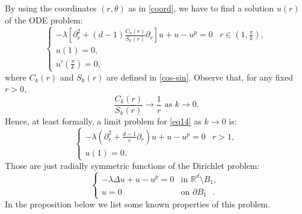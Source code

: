\documentclass[reqno]{amsart}
\numberwithin{equation}{section}
\newenvironment{key words}{\textbf{Keywords}\mbox{  }}{ }
\begin{document}
By using the coordinates $(r, \theta)$ as in \eqref{coord}, we have to find a solution $u(r)$ of the ODE problem:
\begin{equation}\label{eq14}
  \begin{cases}
  -\lambda\left[\partial_{r}^{2}+(d-1)\frac{C_{k}(r)}{S_{k}(r)}\partial_{r}\right]u
  +u-u^{p}=0 & r \in \left(1,\frac{\pi}{k}\right), \\
  u(1)=0, & \\
  u'({\frac{\pi}{k}})=0, &
  \end{cases}
\end{equation}
where $C_k(r)$ and $S_k(r)$ are defined in \eqref{cos-sin}. Observe that, for any fixed $r>0$,
$$ \frac{C_{k}(r)}{S_{k}(r)} \to \frac{1}{r} \mbox{ as } k \to 0.$$
Hence, at least formally, a limit problem for \eqref{eq14} as $k \to 0$ is:
\begin{equation} \label{preradial}
	\begin{cases}
		-\lambda\left(\partial_{r}^{2}+\frac{d-1}{r}\partial_{r}\right)u
		+u-u^{p} =0&r >1, \\
		u(1)=0. &
	\end{cases}
\end{equation}
Those are just radially symmetric functions of the Dirichlet problem:
\begin{equation} \label{radial}
	\begin{cases}
		-\lambda \Delta u+u-{u}^{p}=0 &\mbox{in $\mathbb{R}^{d}\setminus B_{1}$, }\\
		{u} =0 &\mbox{on $\partial B_{1}$ }.
	\end{cases}
\end{equation}
In the proposition below we list some known properties of this problem.
\end{document}
